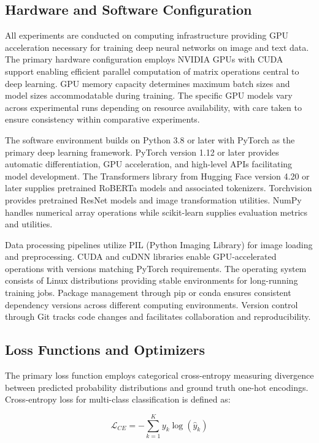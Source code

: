\documentclass[12pt,a4paper]{report}
\begin{document}
\subsection{Hardware and Software Configuration}

All experiments are conducted on computing infrastructure providing GPU acceleration necessary for training deep neural networks on image and text data. The primary hardware configuration employs NVIDIA GPUs with CUDA support enabling efficient parallel computation of matrix operations central to deep learning. GPU memory capacity determines maximum batch sizes and model sizes accommodatable during training. The specific GPU models vary across experimental runs depending on resource availability, with care taken to ensure consistency within comparative experiments.

The software environment builds on Python 3.8 or later with PyTorch as the primary deep learning framework. PyTorch version 1.12 or later provides automatic differentiation, GPU acceleration, and high-level APIs facilitating model development. The Transformers library from Hugging Face version 4.20 or later supplies pretrained RoBERTa models and associated tokenizers. Torchvision provides pretrained ResNet models and image transformation utilities. NumPy handles numerical array operations while scikit-learn supplies evaluation metrics and utilities.

Data processing pipelines utilize PIL (Python Imaging Library) for image loading and preprocessing. CUDA and cuDNN libraries enable GPU-accelerated operations with versions matching PyTorch requirements. The operating system consists of Linux distributions providing stable environments for long-running training jobs. Package management through pip or conda ensures consistent dependency versions across different computing environments. Version control through Git tracks code changes and facilitates collaboration and reproducibility.

\subsection{Loss Functions and Optimizers}

The primary loss function employs categorical cross-entropy measuring divergence between predicted probability distributions and ground truth one-hot encodings. Cross-entropy loss for multi-class classification is defined as:

\begin{equation}
\mathcal{L}_{CE} = -\sum_{k=1}^K y_k \log(\hat{y}_k)
\end{equation}
\end{document}
